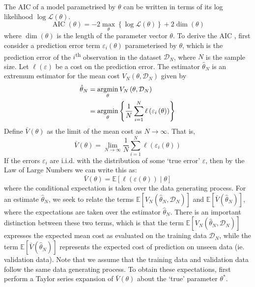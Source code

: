 \documentclass[11pt]{report} %
\begin{document}
The AIC of a model parametrised by $\theta$ can be written in terms of its log likelihood $\log\mathcal{L}\left(\theta\right)$.
\begin{equation}
\operatorname{AIC}\left(\theta\right) = -2\max_{\theta}\left\{\log\mathcal{L}\left(\theta\right)\right\} + 2\dim\left(\theta\right)
\end{equation}
where $\dim\left(\theta\right)$ is the length of the parameter vector $\theta$. To derive the AIC \cite{Ljung1999}, first consider a prediction error term $\varepsilon_{i}\left(\theta\right)$ parameterised by $\theta$, which is the prediction error of the $i$\textsuperscript{th} observation in the dataset $\mathcal{D}_{N}$, where $N$ is the sample size. Let $\ell\left(\varepsilon\right)$ be a cost on the prediction error. The estimator $\hat{\theta}_{N}$ is an extremum estimator for the mean cost $V_{N}\left(\theta, \mathcal{D}_{N}\right)$ given by
\begin{align}
\hat{\theta}_{N} &= \operatorname*{argmin}_{\theta}V_{N}\left(\theta, \mathcal{D}_{N}\right) \\
&= \operatorname*{argmin}_{\theta}\left\{\dfrac{1}{N}\sum_{i = 1}^{N}\ell\left(\varepsilon_{i}\left(\theta\right)\right)\right\}
\end{align}
Define $\bar{V}\left(\theta\right)$ as the limit of the mean cost as $N\to\infty$. That is,
\begin{equation}
\bar{V}\left(\theta\right) = \lim_{N\to\infty}\dfrac{1}{N}\sum_{i = 1}^{N}\ell\left(\varepsilon_{i}\left(\theta\right)\right)
\end{equation}
If the errors $\varepsilon_{i}$ are i.i.d. with the distribution of some `true error' $\varepsilon$, then by the Law of Large Numbers we can write this as:
\begin{equation}
\bar{V}\left(\theta\right) = \mathbb{E}\left[\ell\left(\varepsilon\left(\theta\right)\right)\middle|\theta\right]
\end{equation}
where the conditional expectation is taken over the data generating process. For an estimate $\hat{\theta}_{N}$, we seek to relate the terms $\mathbb{E}\left[V_{N}\left(\hat{\theta}_{N}, \mathcal{D}_{N}\right)\right]$ and $\mathbb{E}\left[\bar{V}\left(\hat{\theta}_{N}\right)\right]$, where the expectations are taken over the estimator $\hat{\theta}_{N}$. There is an important distinction between these two terms, which is that the term $\mathbb{E}\left[V_{N}\left(\hat{\theta}_{N}, \mathcal{D}_{N}\right)\right]$ expresses the expected mean cost as evaluated on the training data $\mathcal{D}_{N}$, while the term $\mathbb{E}\left[\bar{V}\left(\hat{\theta}_{N}\right)\right]$ represents the expected cost of prediction on unseen data (ie. validation data). Note that we assume that the training data and validation data follow the same data generating process. To obtain these expectations, first perform a Taylor series expansion of $\bar{V}\left(\theta\right)$ about the `true' parameter $\theta^{*}$.
\end{document}
